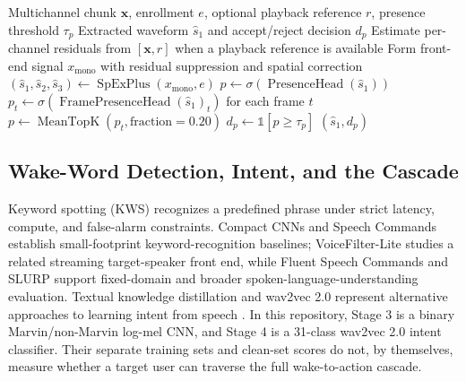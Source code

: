 \begin{algorithm}[H]
  \caption{Cabin extraction followed by scalar or framewise target-presence gating}
  \label{alg:tse-presence}
  \begin{algorithmic}[1]
    \Require Multichannel chunk $\mathbf{x}$, enrollment $e$, optional playback reference $r$, presence threshold $\tau_p$
    \Ensure Extracted waveform $\hat{s}_1$ and accept/reject decision $d_p$
    \State Estimate per-channel residuals from $[\mathbf{x},r]$ when a playback reference is available
    \State Form front-end signal $x_{\mathrm{mono}}$ with residual suppression and spatial correction
    \State $(\hat{s}_1,\hat{s}_2,\hat{s}_3)\gets\operatorname{SpExPlus}(x_{\mathrm{mono}},e)$
      \State $p\gets\sigma(\operatorname{PresenceHead}(\hat{s}_1))$
    \Else
      \State $p_t\gets\sigma(\operatorname{FramePresenceHead}(\hat{s}_1)_t)$ for each frame $t$
      \State $p\gets\operatorname{MeanTopK}(p_t,\text{fraction}=0.20)$
    \EndIf
    \State $d_p\gets\mathbb{1}[p\geq\tau_p]$
    \State \Return $(\hat{s}_1,d_p)$
  \end{algorithmic}
\end{algorithm}

\subsection{Wake-Word Detection, Intent, and the Cascade}
\label{subsec:kws-intent}

Keyword spotting (KWS) recognizes a predefined phrase under strict latency, compute, and false-alarm constraints. Compact CNNs and Speech Commands establish small-footprint keyword-recognition baselines; VoiceFilter-Lite studies a related streaming target-speaker front end, while Fluent Speech Commands and SLURP support fixed-domain and broader spoken-language-understanding evaluation. Textual knowledge distillation and wav2vec 2.0 represent alternative approaches to learning intent from speech \cite{dscnnkws,speechcommands,voicefilterlite,fluentcommands,slurp,textualkd,wav2vec2}. In this repository, Stage 3 is a binary Marvin/non-Marvin log-mel CNN, and Stage 4 is a 31-class wav2vec 2.0 intent classifier. Their separate training sets and clean-set scores do not, by themselves, measure whether a target user can traverse the full wake-to-action cascade.

